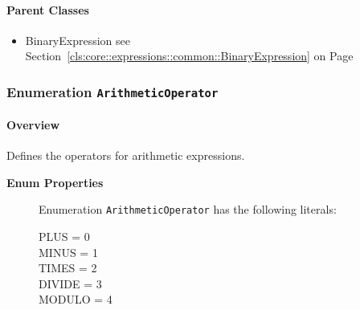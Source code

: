 \paragraph{Parent Classes}
\begin{itemize}
\item BinaryExpression see Section~\ref{cls:core::expressions::common::BinaryExpression} on Page~\pageref{cls:core::expressions::common::BinaryExpression}\end{itemize}
\subsubsection{\Large{Enumeration \bfseries \texttt{ArithmeticOperator}\normalfont}}
\label{cls:core::expressions::common::ArithmeticOperator} 
\paragraph{Overview}
	
			
Defines the operators for arithmetic expressions.	
		
	


\begin{description}

	\item[\textbf{Enum Properties}] Enumeration \texttt{ArithmeticOperator} has the following literals:

	\begin{description}
		
		\item[PLUS = 0]
		\hspace{\fill}
		\nopagebreak

		\item[MINUS = 1]
		\hspace{\fill}
		\nopagebreak

		\item[TIMES = 2]
		\hspace{\fill}
		\nopagebreak

		\item[DIVIDE = 3]
		\hspace{\fill}
		\nopagebreak

		\item[MODULO = 4]
		\hspace{\fill}
		\nopagebreak
 
	\end{description}

\end{description}



